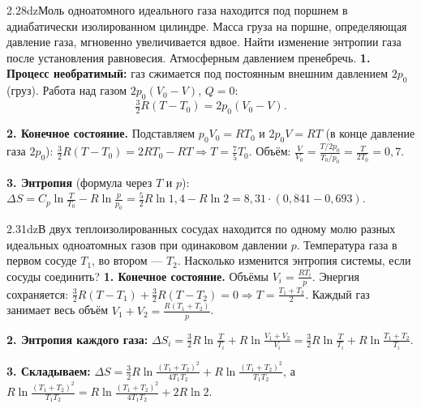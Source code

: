 \begin{problem}{2.28}{dz}{Моль одноатомного идеального газа находится под поршнем в адиабатически изолированном цилиндре. Масса груза на поршне,
определяющая давление газа, мгновенно увеличивается вдвое. Найти изменение энтропии газа после установления равновесия. Атмосферным давлением пренебречь.}
\textbf{1. Процесс необратимый:} газ сжимается под постоянным внешним давлением $2p_0$ (груз). Работа над газом $2p_0(V_0-V)$, $Q=0$:
\[\tfrac32R(T-T_0)=2p_0(V_0-V).\]

\textbf{2. Конечное состояние.} Подставляем $p_0V_0=RT_0$ и $2p_0V=RT$ (в конце давление газа $2p_0$):
$\frac32R(T-T_0)=2RT_0-RT\Rightarrow T=\frac75T_0$. Объём: $\frac V{V_0}=\frac{T/2p_0}{T_0/p_0}=\frac{T}{2T_0}=0{,}7$.

\textbf{3. Энтропия} (формула через $T$ и $p$): $\Delta S=C_p\ln\frac T{T_0}-R\ln\frac p{p_0}=\frac52R\ln1{,}4-R\ln2=8{,}31\cdot(0{,}841-0{,}693)$.
\end{problem}

\begin{problem}{2.31}{dz}{В двух теплоизолированных сосудах находится по одному молю разных идеальных одноатомных газов при одинаковом давлении $p$.
Температура газа в первом сосуде $T_1$, во втором — $T_2$. Насколько изменится энтропия системы, если сосуды соединить?}
\textbf{1. Конечное состояние.} Объёмы $V_i=\frac{RT_i}{p}$. Энергия сохраняется: $\frac32R(T-T_1)+\frac32R(T-T_2)=0\Rightarrow T=\frac{T_1+T_2}2$.
Каждый газ занимает весь объём $V_1+V_2=\frac{R(T_1+T_2)}{p}$.

\textbf{2. Энтропия каждого газа:} $\Delta S_i=\frac32R\ln\frac{T}{T_i}+R\ln\frac{V_1+V_2}{V_i}=\frac32R\ln\frac{T}{T_i}+R\ln\frac{T_1+T_2}{T_i}$.

\textbf{3. Складываем:} $\Delta S=\frac32R\ln\frac{(T_1+T_2)^2}{4T_1T_2}+R\ln\frac{(T_1+T_2)^2}{T_1T_2}$, а
$R\ln\frac{(T_1+T_2)^2}{T_1T_2}=R\ln\frac{(T_1+T_2)^2}{4T_1T_2}+2R\ln2$.
\end{problem}
